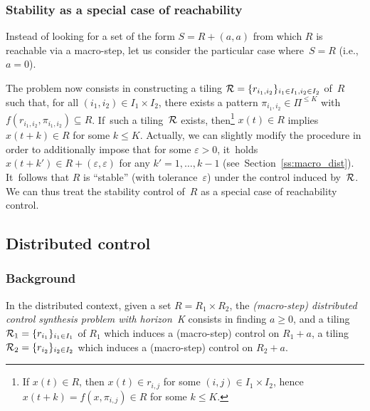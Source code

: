 \subsubsection{Stability as a special case of reachability}\label{ss:special}
Instead of looking for a set of the form $S=R+(a,a)$ from
which $R$ is reachable via a macro-step,
let us consider the particular case where~${S=R}$ (i.e.,~$a=0$).


The problem now consists in constructing a tiling ${\cal
  R}=\{r_{i_1,i_2}\}_{i_1\in I_1, i_2\in I_2}$ of~$R$ such that, for
all $(i_1,i_2)\in I_1\times I_2$, there exists a pattern
$\pi_{i_1,i_2}\in \Pi^{\leq K}$ with ${f(r_{i_1,i_2},
  \pi_{i_1,i_2})\subseteq R}$.  If~such a tiling~${\cal R}$ exists,
then\footnote{If
  $x(t)\in R$, then $x(t)\in r_{i,j}$ for some $(i,j)\in I_1\times
  I_2$, hence $x(t+k)=f(x,\pi_{i,j})\in R$ for some $k\leq K$.}
$x(t)\in R$ implies $x(t+k)\in R$ for some ${k\leq K}$.
Actually, we can slightly modify the procedure in order to
additionally impose that for some $\varepsilon>0$, it~holds $x(t+k')\in
R+(\varepsilon,\varepsilon)$ for any $k'=1,\dots,k-1$
(see~Section~\ref{ss:macro_dist}).  It~follows that $R$ is ``stable''
(with tolerance~$\varepsilon$) under the control induced by~${\cal
  R}$.
%
We can thus treat the stability control of~$R$ 
as a special case  of reachability control.






\subsection{Distributed control}\label{sec:distr}
\subsubsection{Background}

In the distributed context,
given a set $R=R_1\times R_2$,
the \emph{(macro-step) distributed 
control synthesis problem with horizon~K} 
consists in finding $a\geq 0$, and
a tiling ${\cal R}_1=\{r_{i_1}\}_{i_1\in I_1}$ of $R_1$
which induces a (macro-step) control
on $R_1+a$, a 
tiling ${\cal R}_2=\{r_{i_2}\}_{i_2\in I_2}$
which induces a (macro-step) control on $R_2+a$.

